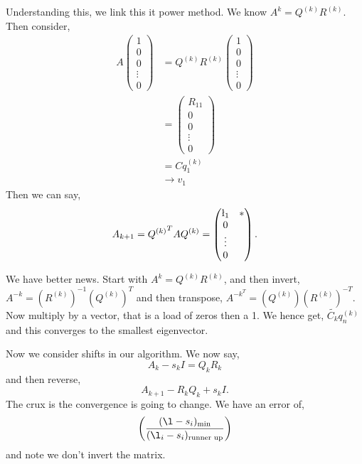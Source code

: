 \noindent
Understanding this, we link this it power method. We know $A^k = Q^{(k)}R^{(k)}$. Then consider,
\begin{align*}
  A \begin{pmatrix}
    1 \\ 0 \\ 0 \\ \vdots \\ 0
  \end{pmatrix}  &= Q^{(k)}R^{(k)} \begin{pmatrix}
    1 \\ 0 \\ 0 \\ \vdots \\ 0
  \end{pmatrix} \\
  &= \begin{pmatrix}
    R_{11} \\ 0 \\ 0 \\ \vdots \\ 0
\end{pmatrix} \\
&= C q_1^{(k)} \\
&\to v_1
\end{align*}
Then we can say,
$$ A_{k+1} = {Q^{(k)}}^T A Q^{(k)} = \begin{pmatrix}
  \l_1 & * \\
  0 & \\
  \vdots &  \\
  0 & \\
\end{pmatrix}. $$

\noindent
We have better news. Start with $A^k = Q^{(k)}R^{(k)}$, and then invert, $A^{-k} = (R^{(k)})^{-1} (Q^{(k)})^T$ and then transpose,  $A^{-k}^T = (Q^{(k)})(R^{(k)})^{-T}$. Now multiply by a vector, that is a load of zeros then a 1. We hence get, $\tilde{C_k}q_n^{(k)}$ and this converges to the smallest eigenvector.

\noindent
Now we consider shifts in our algorithm. We now say,
$$ A_k - s_kI = Q_kR_k $$
and then reverse,
$$ A_{k+1} - R_kQ_k + s_kI. $$
The crux is the convergence is going to change. We have an error of,
$$ \left( \frac{(\l - s_i)_{\text{min}}}{(\l_i - s_i)_{\text{runner up}}} \right) $$
and note we don't invert the matrix.